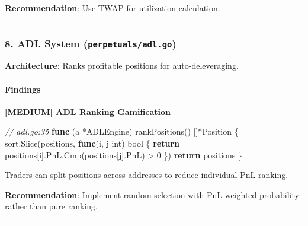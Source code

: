 \documentclass[
]{article}
\newenvironment{Shaded}{}{}
\newcommand{\CommentTok}[1]{\textcolor[rgb]{0.38,0.63,0.69}{\textit{#1}}}
\newcommand{\ControlFlowTok}[1]{\textcolor[rgb]{0.00,0.44,0.13}{\textbf{#1}}}
\newcommand{\DataTypeTok}[1]{\textcolor[rgb]{0.56,0.13,0.00}{#1}}
\newcommand{\DecValTok}[1]{\textcolor[rgb]{0.25,0.63,0.44}{#1}}
\newcommand{\KeywordTok}[1]{\textcolor[rgb]{0.00,0.44,0.13}{\textbf{#1}}}
\newcommand{\NormalTok}[1]{#1}
\newcommand{\OperatorTok}[1]{\textcolor[rgb]{0.40,0.40,0.40}{#1}}
\begin{document}
\textbf{Recommendation}: Use TWAP for utilization calculation.

\begin{center}\rule{0.5\linewidth}{0.5pt}\end{center}

\subsubsection{\texorpdfstring{8. ADL System
(\texttt{perpetuals/adl.go})}{8. ADL System (perpetuals/adl.go)}}\label{8-adl-system-perpetualsadlgo}

\textbf{Architecture}: Ranks profitable positions for auto-deleveraging.

\paragraph{Findings}\label{findings-7}

\textbf{{[}MEDIUM{]} ADL Ranking Gamification}

\begin{Shaded}
\begin{Highlighting}[]
\CommentTok{// adl.go:35}
\KeywordTok{func} \OperatorTok{(}\NormalTok{a }\OperatorTok{*}\NormalTok{ADLEngine}\OperatorTok{)}\NormalTok{ rankPositions}\OperatorTok{()} \OperatorTok{[]*}\NormalTok{Position }\OperatorTok{\{}
\NormalTok{    sort}\OperatorTok{.}\NormalTok{Slice}\OperatorTok{(}\NormalTok{positions}\OperatorTok{,} \KeywordTok{func}\OperatorTok{(}\NormalTok{i}\OperatorTok{,}\NormalTok{ j }\DataTypeTok{int}\OperatorTok{)} \DataTypeTok{bool} \OperatorTok{\{}
        \ControlFlowTok{return}\NormalTok{ positions}\OperatorTok{[}\NormalTok{i}\OperatorTok{].}\NormalTok{PnL}\OperatorTok{.}\NormalTok{Cmp}\OperatorTok{(}\NormalTok{positions}\OperatorTok{[}\NormalTok{j}\OperatorTok{].}\NormalTok{PnL}\OperatorTok{)} \OperatorTok{\textgreater{}} \DecValTok{0}
    \OperatorTok{\})}
    \ControlFlowTok{return}\NormalTok{ positions}
\OperatorTok{\}}
\end{Highlighting}
\end{Shaded}

Traders can split positions across addresses to reduce individual PnL
ranking.

\textbf{Recommendation}: Implement random selection with PnL-weighted
probability rather than pure ranking.

\begin{center}\rule{0.5\linewidth}{0.5pt}\end{center}
\end{document}
